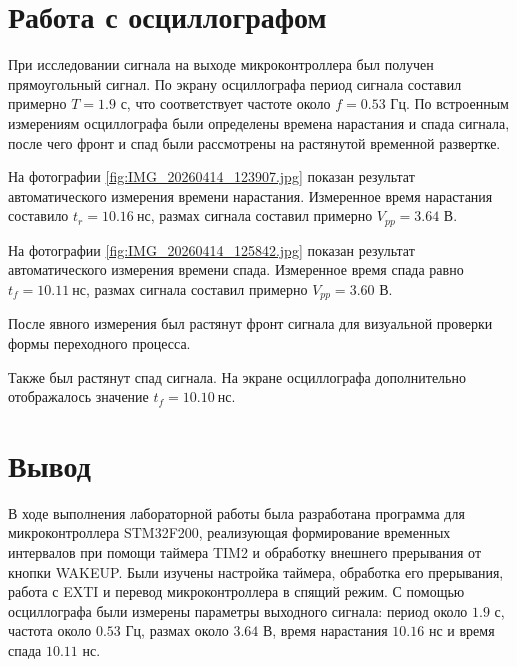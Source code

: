 \section{Работа с осциллографом}

При исследовании сигнала на выходе микроконтроллера был получен прямоугольный сигнал.
По экрану осциллографа период сигнала составил примерно $T = 1.9$ с, что соответствует частоте около $f = 0.53$ Гц.
По встроенным измерениям осциллографа были определены времена нарастания и спада сигнала, после чего фронт и спад были рассмотрены на растянутой временной развертке.


На фотографии \ref{fig:IMG_20260414_123907.jpg} показан результат автоматического измерения времени нарастания.
Измеренное время нарастания составило $t_r = 10.16~\text{нс}$, размах сигнала составил примерно $V_{pp}=3.64$ В.


На фотографии \ref{fig:IMG_20260414_125842.jpg} показан результат автоматического измерения времени спада.
Измеренное время спада равно $t_f = 10.11~\text{нс}$, размах сигнала составил примерно $V_{pp}=3.60$ В.


После явного измерения был растянут фронт сигнала для визуальной проверки формы переходного процесса.


Также был растянут спад сигнала.
На экране осциллографа дополнительно отображалось значение $t_f = 10.10~\text{нс}$.


\section{Вывод}

В ходе выполнения лабораторной работы была разработана программа для микроконтроллера STM32F200, реализующая формирование временных интервалов при помощи таймера TIM2 и обработку внешнего прерывания от кнопки WAKEUP.
Были изучены настройка таймера, обработка его прерывания, работа с EXTI и перевод микроконтроллера в спящий режим.
С помощью осциллографа были измерены параметры выходного сигнала: период около $1.9$ с, частота около $0.53$ Гц, размах около $3.64$ В, время нарастания $10.16$ нс и время спада $10.11$ нс.
